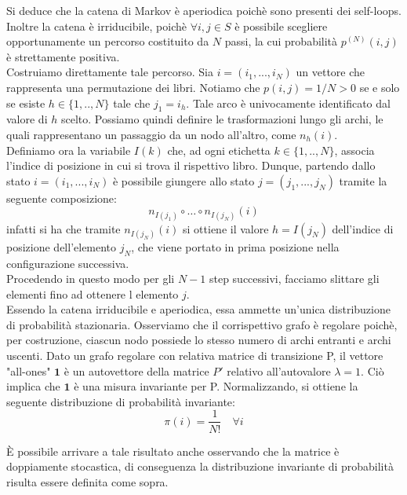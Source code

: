 \documentclass[
	12pt, %
]{fphw}
\begin{document}
Si deduce che la catena di Markov è aperiodica poichè sono presenti dei self-loops.\\
Inoltre la catena è irriducibile, poichè $ \forall i,j \in S$ è possibile scegliere opportunamente un percorso costituito da $N$ passi, la cui probabilità $p^{(N)}(i,j)$ è strettamente positiva.\\
Costruiamo direttamente tale percorso.
Sia $i = (i_1, ... , i_N)$ un vettore che rappresenta una permutazione dei libri.
Notiamo che $p(i,j)=1/N>0$ se e solo se esiste $h\in \{1,..,N\}$ tale che $j_1 = i_h$.
Tale arco è univocamente identificato dal valore di $h$ scelto.
Possiamo quindi definire le trasformazioni lungo gli archi, le quali rappresentano un passaggio da un nodo all'altro, come $n_h(i)$.\\
Definiamo ora la variabile $I(k)$ che, ad ogni etichetta $k \in \{1,..,N\}$, associa l'indice di posizione in cui si trova il rispettivo libro.
Dunque, partendo dallo stato $i = (i_1, ... , i_N)$ è possibile giungere allo stato $j = (j_1, ... , j_N)$ tramite la seguente composizione:
\begin{equation}
	n_{I(j_1)} \circ \dots \circ n_{I(j_N)} (i)
\end{equation}
infatti si ha che tramite $n_{I(j_N)} (i)$ si ottiene il valore $h = I(j_N)$ dell'indice di posizione dell'elemento $j_N$, che viene portato in prima posizione nella configurazione successiva.\\
Procedendo in questo modo per gli $N-1$ step successivi, facciamo slittare gli elementi fino ad ottenere l elemento $j$.\\
Essendo la catena irriducibile e aperiodica, essa ammette un'unica distribuzione di probabilità stazionaria.
Osserviamo che il corrispettivo grafo è regolare poichè, per costruzione, ciascun nodo possiede lo stesso numero di archi entranti e archi uscenti.
Dato un grafo regolare con relativa matrice di transizione P, il vettore "all-ones" $\mathbf{1}$ è un autovettore della matrice $P'$ relativo all'autovalore $\lambda = 1$.
Ciò implica che $\mathbf{1}$ è una misura invariante per P. Normalizzando, si ottiene la seguente distribuzione di probabilità invariante:
\begin{equation*}
	\pi(i) = \frac{1}{N!} \quad \forall i
\end{equation*}
	
\MakeUppercase{è} possibile arrivare a tale risultato anche osservando che la matrice è doppiamente stocastica, di conseguenza la distribuzione invariante di probabilità risulta essere definita come sopra.



\end{document}
